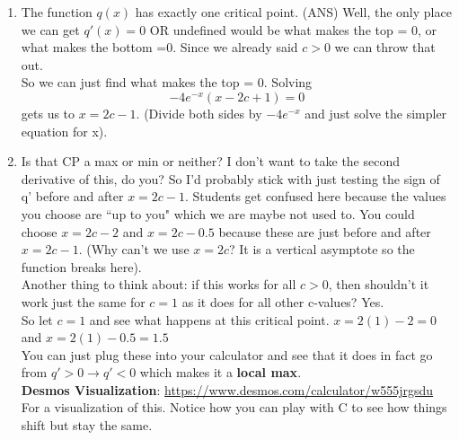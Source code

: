 \documentclass[10pt]{article}
\begin{document}
\begin{enumerate}
	
	\item The function $ q(x) $ has exactly one critical point.  
		\subitem (ANS) Well, the only place we can get $ q'(x)=0$ OR undefined would be what makes the top = 0, or what makes the bottom =0.  Since we already said $c>0$ we can throw that out.\\
		
		So we can just find what makes the top = 0.  Solving $$-4e^{-x}(x-2c+1)=0$$ gets us to $x = 2c - 1$.  (Divide both sides by $-4e^{-x}$ and just solve the simpler equation for x).
		
		
	\item Is that CP a max or min or neither?
		\subitem I don't want to take the second derivative of this, do you?  So I'd probably stick with just testing the sign of q' before and after $x=2c-1$.  Students get confused here because the values you choose are ``up to you" which we are maybe not used to.  You could choose $x=2c-2$ and $x=2c-0.5$ because these are just before and after $x=2c-1$.  (Why can't we use $ x=2c $? It is a vertical asymptote so the function breaks here).\\
		
		Another thing to think about: if this works for all $c>0$, then shouldn't it work just the same for $c=1$ as it does for all other c-values?  Yes.\\
		
		So let $ c=1 $ and see what happens at this critical point.  $x=2(1)-2=0$ and $x=2(1)-0.5=1.5$\\
		
		You can just plug these into your calculator and see that it does in fact go from $q'>0 \to q'<0$ which makes it a \textbf{local max}.\\
		
		\textbf{Desmos Visualization}: \url{https://www.desmos.com/calculator/w555jrgsdu} For a visualization of this.  Notice how you can play with C to see how things shift but stay the same.
	
\end{enumerate}
\vspace{2em}
\end{document}
